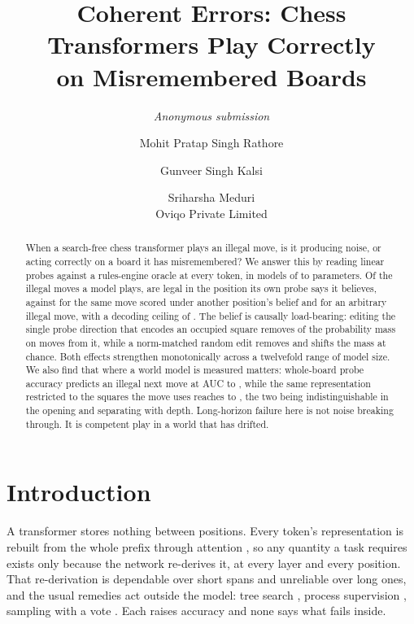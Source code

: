\documentclass[10pt]{article}
\title{\bf Coherent Errors: Chess Transformers Play Correctly\\on Misremembered Boards}
\author{\normalsize\itshape Anonymous submission}
\author{Mohit Pratap Singh Rathore \and Gunveer Singh Kalsi \and Sriharsha Meduri\\
  \small Oviqo Private Limited}
\date{}
\begin{document}
\maketitle

\begin{abstract}
When a search-free chess transformer plays an illegal move, is it producing
noise, or acting correctly on a board it has misremembered? We answer this by
reading linear probes against a rules-engine oracle at every token, in models of
 to  parameters. Of the illegal moves a
model plays,  are legal in the position its own probe says it
believes, against  for the same move scored under another
position's belief and  for an arbitrary illegal move, with a
decoding ceiling of . The belief is causally load-bearing:
editing the single probe direction that encodes an occupied square removes
 of the probability mass on moves from it, while a
norm-matched random edit removes  and shifts the mass at
chance. Both effects strengthen monotonically across a twelvefold range of model
size. We also find that where a world model is measured matters: whole-board
probe accuracy predicts an illegal next move at AUC  to
, while the same representation restricted to the squares the
move uses reaches  to , the two being
indistinguishable in the opening and separating with depth. Long-horizon failure
here is not noise breaking through. It is competent play in a world that has
drifted.
\end{abstract}

\section{Introduction}

A transformer stores nothing between positions. Every token's representation is
rebuilt from the whole prefix through attention \citep{vaswani2017attention}, so
any quantity a task requires exists only because the network re-derives it, at
every layer and every position. That re-derivation is dependable over short spans
and unreliable over long ones, and the usual remedies act outside the model:
tree search \citep{yao2023tree}, process supervision \citep{lightman2024lets},
sampling with a vote \citep{wang2023selfconsistency}. Each raises accuracy and
none says what fails inside.
\end{document}
